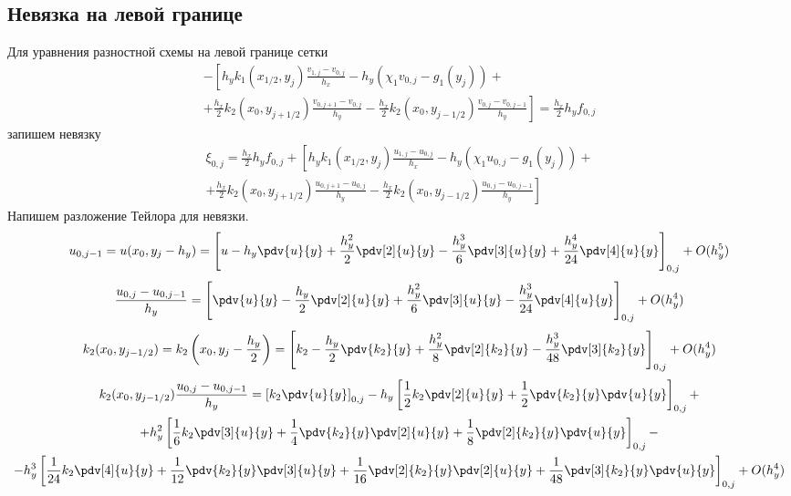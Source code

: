 \subsection{Невязка на левой границе}
Для уравнения разностной схемы на левой границе сетки
\begin{multline*}
    - \left[
    h_y k_1(x_{1/2},y_{j}) \frac{v_{1,j} - v_{0,j}}{h_x} - h_y \left( \chi_1 v_{0,j} - g_1(y_{j}) \right) + \right. \\
    \left. +
    \frac{h_x}{2} k_2(x_{0},y_{j+1/2}) \frac{v_{0,j+1} - v_{0,j}}{h_y} - \frac{h_x}{2} k_2(x_{0},y_{j-1/2}) \frac{v_{0,j} - v_{0,j-1}}{h_y}
    \right] =
    \frac{h_x}{2} h_y f_{0,j}
\end{multline*}
запишем невязку
\begin{multline*}
    \xi_{0,j} = \frac{h_x}{2} h_y f_{0,j} + \left[
    h_y k_1(x_{1/2},y_{j}) \frac{u_{1,j} - u_{0,j}}{h_x} - h_y \left( \chi_1 u_{0,j} - g_1(y_{j}) \right) + \right. \\
    \left. +
    \frac{h_x}{2} k_2(x_{0},y_{j+1/2}) \frac{u_{0,j+1} - u_{0,j}}{h_y} - \frac{h_x}{2} k_2(x_{0},y_{j-1/2}) \frac{u_{0,j} - u_{0,j-1}}{h_y}
    \right]
\end{multline*}
Напишем разложение Тейлора для невязки.
\[
    u_{0,j-1} = u(x_{0}, y_{j} - h_y) = \left[ u - h_y \pdv{u}{y} + \frac{h_y^2}{2} \pdv[2]{u}{y} -
    \frac{h_y^3}{6} \pdv[3]{u}{y} + \frac{h_y^4}{24} \pdv[4]{u}{y} \right]_{0,j} + O(h_y^5)
\]
\[
    \frac{u_{0,j} - u_{0,j-1}}{h_y} = \left[ \pdv{u}{y} - \frac{h_y}{2} \pdv[2]{u}{y} +
    \frac{h_y^2}{6} \pdv[3]{u}{y} - \frac{h_y^3}{24} \pdv[4]{u}{y} \right]_{0,j} + O(h_y^4)
\]
\[
    k_2(x_{0},y_{j-1/2}) = k_2 \left( x_{0},y_{j} - \frac{h_y}{2} \right) = \left[
        k_2 - \frac{h_y}{2} \pdv{k_2}{y} + \frac{h_y^2}{8} \pdv[2]{k_2}{y} - \frac{h_y^3}{48} \pdv[3]{k_2}{y}
    \right]_{0,j} + O(h_y^4)
\]
\begin{multline*}
    k_2(x_{0},y_{j-1/2}) \frac{u_{0,j} - u_{0,j-1}}{h_y} = \left[ k_2 \pdv{u}{y} \right]_{0,j} -
    h_y \left[ \frac{1}{2} k_2 \pdv[2]{u}{y} + \frac{1}{2} \pdv{k_2}{y} \pdv{u}{y} \right]_{0,j} + \\
    + h_y^2 \left[ \frac{1}{6} k_2 \pdv[3]{u}{y} + \frac{1}{4} \pdv{k_2}{y} \pdv[2]{u}{y} + \frac{1}{8} \pdv[2]{k_2}{y} \pdv{u}{y} \right]_{0,j} - \\
    - h_y^3 \left[ \frac{1}{24} k_2 \pdv[4]{u}{y} + \frac{1}{12} \pdv{k_2}{y} \pdv[3]{u}{y} + \frac{1}{16} \pdv[2]{k_2}{y} \pdv[2]{u}{y} + \frac{1}{48} \pdv[3]{k_2}{y} \pdv{u}{y} \right]_{0,j} + O(h_y^4)
\end{multline*}

